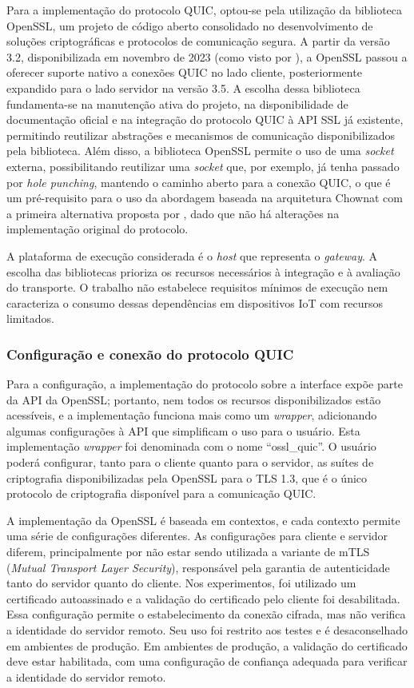Para a implementação do protocolo QUIC, optou-se pela utilização da biblioteca OpenSSL, um projeto de código aberto consolidado no desenvolvimento de soluções criptográficas e protocolos de comunicação segura. A partir da versão 3.2, disponibilizada em novembro de 2023 (como visto por \citep{openssl_quic}), a OpenSSL passou a oferecer suporte nativo a conexões QUIC no lado cliente, posteriormente expandido para o lado servidor na versão 3.5. A escolha dessa biblioteca fundamenta-se na manutenção ativa do projeto, na disponibilidade de documentação oficial e na integração do protocolo QUIC à API SSL já existente, permitindo reutilizar abstrações e mecanismos de comunicação disponibilizados pela biblioteca. Além disso, a biblioteca OpenSSL permite o uso de uma \textit{socket} externa, possibilitando reutilizar uma \textit{socket} que, por exemplo, já tenha passado por \textit{hole punching}, mantendo o caminho aberto para a conexão QUIC, o que é um pré-requisito para o uso da abordagem baseada na arquitetura Chownat com a primeira alternativa proposta por \citep{draft-seemann-quic-nat-traversal}, dado que não há alterações na implementação original do protocolo.

A plataforma de execução considerada é o \textit{host} que representa o \textit{gateway}. A escolha das bibliotecas prioriza os recursos necessários à integração e à avaliação do transporte. O trabalho não estabelece requisitos mínimos de execução nem caracteriza o consumo dessas dependências em dispositivos IoT com recursos limitados.

\subsubsection{Configuração e conexão do protocolo QUIC}

Para a configuração, a implementação do protocolo sobre a interface expõe parte da API da OpenSSL; portanto, nem todos os recursos disponibilizados estão acessíveis, e a implementação funciona mais como um \textit{wrapper}, adicionando algumas configurações à API que simplificam o uso para o usuário. Esta implementação \textit{wrapper} foi denominada com o nome ``ossl\_quic''. O usuário poderá configurar, tanto para o cliente quanto para o servidor, as suítes de criptografia disponibilizadas pela OpenSSL para o TLS 1.3, que é o único protocolo de criptografia disponível para a comunicação QUIC.

A implementação da OpenSSL é baseada em contextos, e cada contexto permite uma série de configurações diferentes. As configurações para cliente e servidor diferem, principalmente por não estar sendo utilizada a variante de mTLS (\textit{Mutual Transport Layer Security}), responsável pela garantia de autenticidade tanto do servidor quanto do cliente. Nos experimentos, foi utilizado um certificado autoassinado e a validação do certificado pelo cliente foi desabilitada. Essa configuração permite o estabelecimento da conexão cifrada, mas não verifica a identidade do servidor remoto. Seu uso foi restrito aos testes e é desaconselhado em ambientes de produção. Em ambientes de produção, a validação do certificado deve estar habilitada, com uma configuração de confiança adequada para verificar a identidade do servidor remoto.

